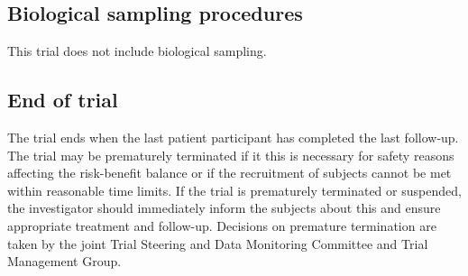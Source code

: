 \documentclass[
]{scrartcl}
\begin{document}
\begin{table}

\caption{\label{tbl-procedures-followup}Overview of trial follow-up
procedures}


\end{table}%

\subsection{Biological sampling
procedures}\label{biological-sampling-procedures}

This trial does not include biological sampling.

\subsection{End of trial}\label{end-of-trial}

The trial ends when the last patient participant has completed the last
follow-up. The trial may be prematurely terminated if it this is
necessary for safety reasons affecting the risk-benefit balance or if
the recruitment of subjects cannot be met within reasonable time limits.
If the trial is prematurely terminated or suspended, the investigator
should immediately inform the subjects about this and ensure appropriate
treatment and follow-up. Decisions on premature termination are taken by
the joint Trial Steering and Data Monitoring Committee and Trial
Management Group.
\end{document}
